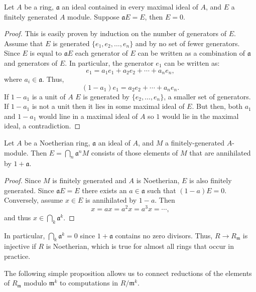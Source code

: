 {\begin{proposition}[Nakayama] 
  Let $A$ be a ring, $\mathfrak{a}$ an ideal contained in every
  maximal ideal of $A$, and $E$ a finitely generated $A$ module.
  Suppose $\mathfrak{a}E = E$, then $E = 0$.
\end{proposition}

\begin{proof}
This is easily proven by induction on the number of generators of
$E$. Assume that $E$ is generated $\{e_1, e_2, \ldots, e_n\}$ and by
no set of fewer generators.  Since $E$ is equal to $\mathfrak{a}E$
each generator of $E$ can be written as a combination of
$\mathfrak{a}$ and generators of $E$.  In particular, the generator
$e_1$ can be written as:
\[
e_1 = a_1 e_1 + a_2 e_2 + \cdots + a_n e_n,
\]
where $a_i \in \mathfrak{a}$.  Thus,
\[
(1 - a_1) e_1 = a_2 e_2 + \cdots + a_n e_n.
\]
If $1 - a_1$ is a unit of $A$ $E$ is generated by $\{e_2,\ldots,
e_n\}$, a smaller set of generators.  If $1-a_1$ is not a unit then it
lies in some maximal ideal of $E$.  But then, both $a_1$ and $1- a_1$
would line in a maximal ideal of $A$ so $1$ would lie in the maximal
ideal, a contradiction.
\end{proof}

\begin{proposition}[Krull]
Let $A$ be a Noetherian ring, $\mathfrak{a}$ an ideal of $A$, and $M$ a
finitely-generated $A$-module. Then $E = \bigcap_n \mathfrak{a}^n M$ consists
of those elements of $M$ that are annihilated by $1 + \mathfrak{a}$. 
\end{proposition}

\begin{proof}
Since $M$ is finitely generated and $A$ is Noetherian, $E$ is also
finitely generated. Since $\mathfrak{a}E = E$ there exists an $a \in
\mathfrak{a}$ such that $(1-a)E = 0$.  Conversely, assume $x \in E$ is
annihilated by $1 - a$.  Then
\[
x = ax = a^2 x = a^3 x = \cdots,
\]
and thus $x \in \bigcap_k \mathfrak{a}^k$.
\end{proof}


In particular, $\bigcap_k \mathfrak{a}^k = 0$ since $1 + \mathfrak{a}$
contains no zero divisors.  Thus, $R \rightarrow R_\mathfrak{m}$ is
injective if $R$ is Noetherian, which is true
for almost all rings that occur in practice.  

The following simple proposition allows us to connect reductions of the 
elements of $R_\mathfrak{m}$ modulo $\mathfrak{m}^k$ to computations in 
$R/\mathfrak{m}^k$.

}
